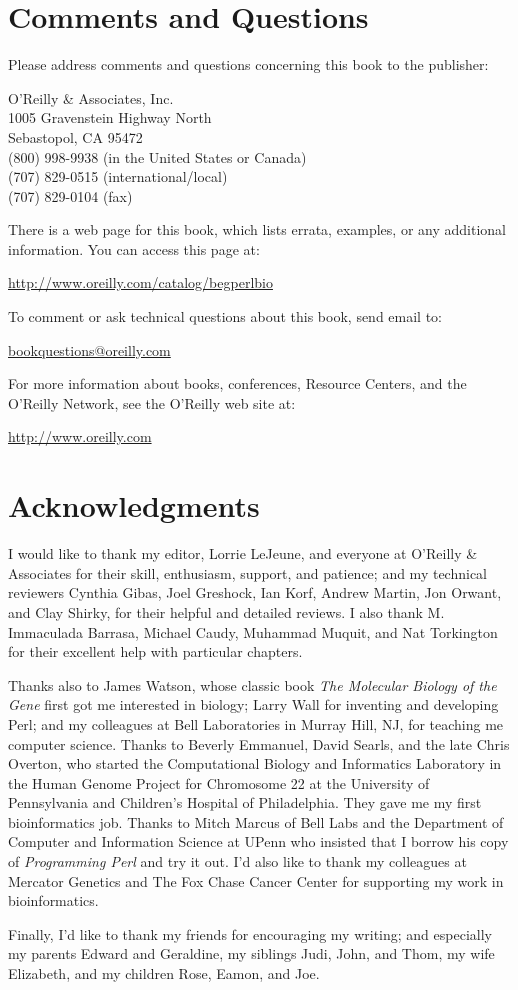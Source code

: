 \section*{Comments and Questions}
Please address comments and questions concerning this book to the publisher:

O'Reilly \& Associates, Inc.\\
1005 Gravenstein Highway North\\
Sebastopol, CA 95472\\
(800) 998-9938 (in the United States or Canada)\\
(707) 829-0515 (international/local)\\
(707) 829-0104 (fax)

There is a web page for this book, which lists errata, examples, or any additional information. You can access this page at:

\href{http://www.oreilly.com/catalog/begperlbio}{http://www.oreilly.com/catalog/begperlbio}

To comment or ask technical questions about this book, send email to:

\href{bookquestions@oreilly.com}{bookquestions@oreilly.com}

For more information about books, conferences, Resource Centers, and the O'Reilly Network, see the O'Reilly web site at:

\href{http://www.oreilly.com}{http://www.oreilly.com}

\section*{Acknowledgments}
I would like to thank my editor, Lorrie LeJeune, and everyone at O'Reilly \& Associates for their skill, enthusiasm, support, and patience; and my technical reviewers Cynthia Gibas, Joel Greshock, Ian Korf, Andrew Martin, Jon Orwant, and Clay Shirky, for their helpful and detailed reviews. I also thank M. Immaculada Barrasa, Michael Caudy, Muhammad Muquit, and Nat Torkington for their excellent help with particular chapters.

Thanks also to James Watson, whose classic book \textit{The Molecular Biology of the Gene} first got me interested in biology; Larry Wall for inventing and developing Perl; and my colleagues at Bell Laboratories in Murray Hill, NJ, for teaching me computer science. Thanks to Beverly Emmanuel, David Searls, and the late Chris Overton, who started the Computational Biology and Informatics Laboratory in the Human Genome Project for Chromosome 22 at the University of Pennsylvania and Children's Hospital of Philadelphia. They gave me my first bioinformatics job. Thanks to Mitch Marcus of Bell Labs and the Department of Computer and Information Science at UPenn who insisted that I borrow his copy of \textit{Programming Perl} and try it out. I'd also like to thank my colleagues at Mercator Genetics and The Fox Chase Cancer Center for supporting my work in bioinformatics.

Finally, I'd like to thank my friends for encouraging my writing; and especially my parents Edward and Geraldine, my siblings Judi, John, and Thom, my wife Elizabeth, and my children Rose, Eamon, and Joe.
